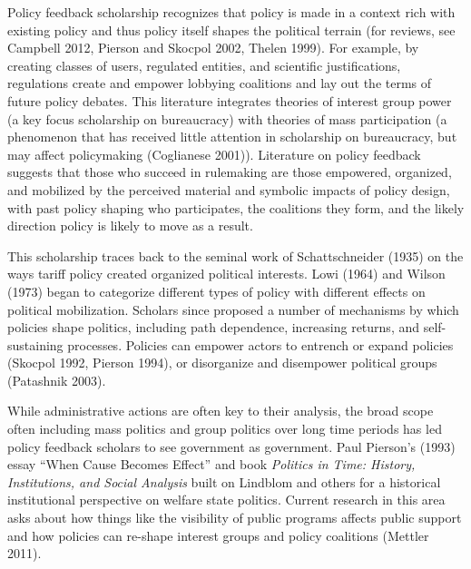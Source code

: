 Policy feedback scholarship recognizes that policy is made in a context rich with existing policy and thus policy itself shapes the political terrain (for reviews, see Campbell 2012, Pierson and Skocpol 2002, Thelen 1999). For example, by creating classes of users, regulated entities, and scientific justifications, regulations create and empower lobbying coalitions and lay out the terms of future policy debates. This literature integrates theories of interest group power (a key focus scholarship on bureaucracy) with theories of mass participation (a phenomenon that has received little attention in scholarship on bureaucracy, but may affect policymaking (Coglianese 2001)). Literature on policy feedback suggests that those who succeed in rulemaking are those empowered, organized, and mobilized by the perceived material and symbolic impacts of policy design, with past policy shaping who participates, the coalitions they form, and the likely direction policy is likely to move as a result. 

This scholarship traces back to the seminal work of Schattschneider (1935) on the ways tariff policy created organized political interests. Lowi (1964) and Wilson (1973) began to categorize different types of policy with different effects on political mobilization. Scholars since proposed a number of mechanisms by which policies shape politics, including path dependence, increasing returns, and self-sustaining processes. Policies can empower actors to entrench or expand policies (Skocpol 1992, Pierson 1994), or disorganize and disempower political groups (Patashnik 2003). 


While administrative actions are often key to their analysis, the broad scope often including mass politics and group politics over long time periods has led policy feedback scholars to see government as government. Paul Pierson's (1993) essay ``When Cause Becomes Effect'' and book \textit{Politics in Time: History, Institutions, and Social Analysis} built on Lindblom and others for a historical institutional perspective on welfare state politics. Current research in this area asks about how things like the visibility of public programs affects public support and how policies can re-shape interest groups and policy coalitions (Mettler 2011). 

